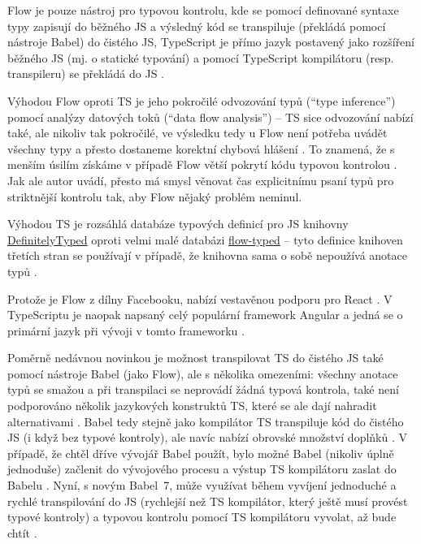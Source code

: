 Flow je pouze nástroj pro typovou kontrolu, kde se pomocí definované syntaxe typy zapisují do běžného JS a výsledný kód se transpiluje (překládá pomocí nástroje Babel) do čistého JS, TypeScript je přímo jazyk postavený jako rozšíření běžného JS (mj. o statické typování) a pomocí TypeScript kompilátoru (resp. transpileru) se překládá do JS \cite{types-mariusschulz, types-objectcomputing}. 

Výhodou Flow oproti TS je jeho pokročilé odvozování typů (\enquote{type inference}) pomocí analýzy datových toků (\enquote{data flow analysis}) -- TS sice odvozování nabízí také, ale nikoliv tak pokročilé, ve výsledku tedy u Flow není potřeba uvádět všechny typy a přesto dostaneme korektní chybová hlášení \cite{types-objectcomputing, types-medium}. To znamená, že s menším úsilím získáme v případě Flow větší pokrytí kódu typovou kontrolou \cite{types-jamie}. Jak ale autor \cite{types-medium} uvádí, přesto má smysl věnovat čas explicitnímu psaní typů pro striktnější kontrolu tak, aby Flow nějaký problém neminul. 

Výhodou TS je rozsáhlá databáze typových definicí pro JS knihovny \href{https://github.com/DefinitelyTyped/DefinitelyTyped}{DefinitelyTyped} oproti velmi malé databázi \href{https://github.com/flow-typed/flow-typed}{flow-typed} -- tyto definice knihoven třetích stran se používají v případě, že knihovna sama o sobě nepoužívá anotace typů \cite{types-objectcomputing}. 

Protože je Flow z dílny Facebooku, nabízí vestavěnou podporu pro React \cite{types-objectcomputing}. V TypeScriptu je naopak napsaný celý populární framework Angular a jedná se o primární jazyk při vývoji v tomto frameworku \cite{types-angular}.

Poměrně nedávnou novinkou je možnost transpilovat TS do čistého JS také pomocí nástroje Babel (jako Flow), ale s několika omezeními: všechny anotace typů se smažou a při transpilaci se neprovádí žádná typová kontrola, také není podporováno několik jazykových konstruktů TS, které se ale dají nahradit alternativami \cite{types-iamturns}. Babel tedy stejně jako kompilátor TS transpiluje kód do čistého JS (i když bez typové kontroly), ale navíc nabízí obrovské množství doplňků \cite{types-iamturns}. V případě, že chtěl dříve vývojář Babel použít, bylo možné Babel (nikoliv úplně jednoduše) začlenit do vývojového procesu a výstup TS kompilátoru zaslat do Babelu \cite{types-iamturns}. Nyní, s novým Babel~7, může využívat během vyvíjení jednoduché a rychlé transpilování do JS (rychlejší než TS kompilátor, který ještě musí provést typové kontroly) a typovou kontrolu pomocí TS kompilátoru vyvolat, až bude chtít \cite{types-iamturns}.

